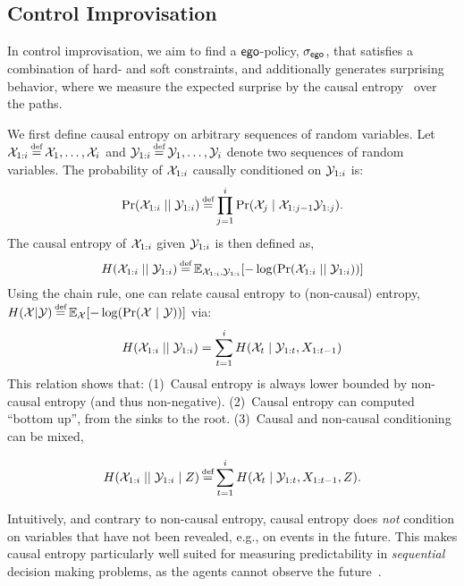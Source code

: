 {{{

\subsection{Control Improvisation}
In control improvisation, we aim to find a $\mathsf{ego}$-policy,
${\sigma_{\mathsf{ego}}}$, that satisfies a combination of hard- and soft
constraints, and additionally generates surprising behavior, where we
measure the expected surprise by the causal
entropy~\cite{DirectedInfoTheoery} over the paths.

We first define causal entropy on arbitrary sequences of random variables.
Let $\rv{X}_{1:i} \eqdef \rv{X}_1, \hdots, \rv{X}_i$ and $\rv{Y}_{1:i} \eqdef
\rv{Y}_1,\hdots,\rv{Y}_i$ denote two sequences of random variables. The
probability of $ {\mathcal{X}}_{1:i}$ causally conditioned on ${\mathcal{Y}}_{1:i}$ is:
\begin{equation}
  \causalprob{\rv{X}_{1:i}}{\rv{Y}_{1:i}} \eqdef \prod_{j=1}^i \Pr(\rv{X}_j \mid \rv{X}_{1:j-1}\rv{Y}_{1:j}).
\end{equation}
The causal entropy of ${\mathcal{X}}_{1:i}$ given ${\mathcal{Y}}_{1:i}$ is then defined as,
\begin{equation}
  H(\rv{X}_{1:i}\mid\mid \rv{Y}_{1:i}) \eqdef \expOver{\rv{X}_{1:i},\rv{Y}_{1:i}}{-\log(\causalprob{\rv{X}_{1:i}}{\rv{Y}_{1:i}})}
\end{equation}
Using the chain rule, one can relate causal entropy to (non-causal) entropy, $H(\rv{X} | \rv{Y}) \eqdef \expOver{\rv{X}}{-\log(\Pr(\rv{X}~|~\rv{Y}))}$ via:
\begin{equation}
  H({\mathcal{X}}_{1:i}\mid\mid {\mathcal{Y}}_{1:i}) = \sum_{t=1}^i H({\mathcal{X}}_t \mid {\mathcal{Y}}_{1:t}, X_{1:t-1})
\end{equation}
This relation shows that:
(1)~Causal entropy is always lower bounded by non-causal entropy (and
thus non-negative). 
(2)~Causal entropy can computed ``bottom up'', from the sinks to the root.
(3)~Causal and non-causal conditioning can be mixed,

\vspace{-1.1em}
\begin{equation}
  H(\rv{X}_{1:i}\mid\mid \rv{Y}_{1:i} \mid Z) \eqdef \sum_{t=1}^i H(\rv{X}_t \mid \rv{Y}_{1:t}, X_{1:t-1}, Z).
\end{equation}
    
Intuitively, and contrary to non-causal entropy, causal entropy does \emph{not}
condition on variables that have not been revealed, e.g., on events in the future. 
This makes causal entropy particularly well suited for measuring
predictability in \emph{sequential} decision making problems, as the 
agents cannot observe the future~\cite{mceThesis}.

}}}
